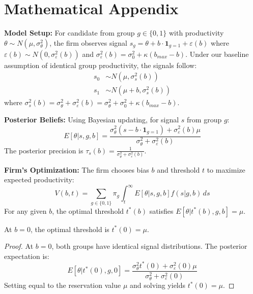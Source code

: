 \appendix
\section{Mathematical Appendix}

\textbf{Model Setup:} For candidate from group $g \in \{0,1\}$ with productivity $\theta \sim N(\mu, \sigma_\theta^2)$, the firm observes signal $s_g = \theta + b \cdot \mathbf{1}_{g=1} + \varepsilon(b)$ where $\varepsilon(b) \sim N(0, \sigma_\varepsilon^2(b))$ and $\sigma_\varepsilon^2(b) = \sigma_0^2 + \kappa(b_{max} - b)$. Under our baseline assumption of identical group productivity, the signals follow:
\begin{align}
s_0 &\sim N(\mu, \sigma_s^2(b)) \\
s_1 &\sim N(\mu + b, \sigma_s^2(b))
\end{align}
where $\sigma_s^2(b) = \sigma_\theta^2 + \sigma_\varepsilon^2(b) = \sigma_\theta^2 + \sigma_0^2 + \kappa(b_{max} - b)$.

\textbf{Posterior Beliefs:} Using Bayesian updating, for signal $s$ from group $g$:
\begin{equation}
E[\theta | s, g, b] = \frac{\sigma_\theta^2 (s - b \cdot \mathbf{1}_{g=1}) + \sigma_\varepsilon^2(b) \mu}{\sigma_\theta^2 + \sigma_\varepsilon^2(b)} \label{eq:posterior}
\end{equation}
The posterior precision is $\tau_s(b) = \frac{1}{\sigma_\theta^2 + \sigma_\varepsilon^2(b)}$.

\textbf{Firm's Optimization:} The firm chooses bias $b$ and threshold $t$ to maximize expected productivity:
\begin{equation}
V(b,t) = \sum_{g \in \{0,1\}} \pi_g \int_t^\infty E[\theta | s, g, b] f(s|g,b) \, ds \label{eq:value_function}
\end{equation}
For any given $b$, the optimal threshold $t^*(b)$ satisfies $E[\theta | t^*(b), g, b] = \mu$.

\begin{lemma}
At $b = 0$, the optimal threshold is $t^*(0) = \mu$.
\end{lemma}
\begin{proof}
At $b = 0$, both groups have identical signal distributions. The posterior expectation is:
\begin{equation}
E[\theta | t^*(0), g, 0] = \frac{\sigma_\theta^2 t^*(0) + \sigma_\varepsilon^2(0) \mu}{\sigma_\theta^2 + \sigma_\varepsilon^2(0)}
\end{equation}
Setting equal to the reservation value $\mu$ and solving yields $t^*(0) = \mu$.
\end{proof}

